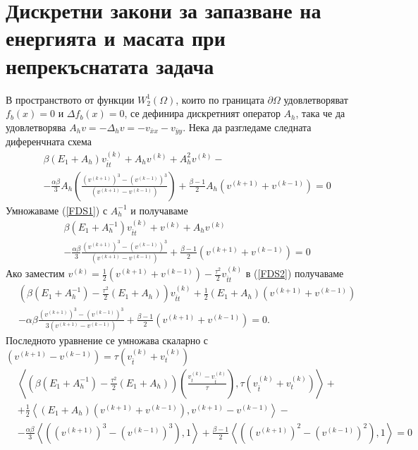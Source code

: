 \documentclass{article}
\newcommand{\rf}[1]{(\ref{#1})}
\begin{document}
\section{Дискретни закони за запазване на енергията и масата при непрекъснатата задача}
В пространството от функции $W^1_2(\Omega)$, които по границата $\partial\Omega$ удовлетворяват $f_b(x) = 0$ и $\Delta f_b(x) = 0$, се дефинира дискретният оператор $A_h$, така че да удовлетворява $A_h v=-\Delta_h v=-v_{\bar{x}x} - v_{\bar{y}y}$. Нека да разгледаме следната диференчната схема
\begin{align}\label{FDS1}
&\beta (E_1+A_h)v_{\bar{t}t}^{(k)} + A_hv^{(k)}+A_h^2 v^{(k)} -\nonumber\\
&-\frac{\alpha \beta}{3} A_h\left(\frac{(v^{(k+1)})^3-(v^{(k-1)})^3}{(v^{(k+1)}-v^{(k-1)})} \right) + \frac{\beta - 1}{2}A_h\left( v^{(k+1)}+v^{(k-1)} \right) =0
\end{align}
Умножаваме \rf{FDS1} с $A_h^{-1}$ и получаваме
\begin{align}\label{FDS2}
&\beta (E_1+A_h^{-1})v_{\bar{t}t}^{(k)} + v^{(k)}+A_h v^{(k)} \nonumber\\
&-\frac{\alpha \beta}{3} \frac{(v^{(k+1)})^3-(v^{(k-1)})^3}{(v^{(k+1)}-v^{(k-1)})} + \frac{\beta - 1}{2}\left( v^{(k+1)} + v^{(k-1)} \right)= 0
\end{align}
Ако заместим $v^{(k)}=\frac{1}{2}(v^{(k+1)}+v^{(k-1)})-\frac{\tau^2}{2}v_{\bar{t}t}^{(k)}$ в \rf{FDS2} получаваме
\begin{align*}
&\left( \beta (E_1+A_h^{-1})- \frac{\tau^2}{2}(E_1+A_h ) \right)v_{\bar{t}t}^{(k)}  + \frac{1}{2} (E_1 +A_h )(v^{(k+1)}+v^{(k-1)}) \\
&-\alpha \beta \frac{(v^{(k+1)})^3-(v^{(k-1)})^3}{3(v^{(k+1)}-v^{(k-1)})} + \frac{\beta - 1}{2}\left( v^{(k+1)}+v^{(k-1)} \right) = 0.
\end{align*}
Последното уравнение се умножава скаларно с $(v^{(k+1)}-v^{(k-1)})=\tau (v_{\bar{t}}^{(k)} + v_{t}^{(k)})$
\begin{align*}
&\left< \left( \beta (E_1+A_h^{-1})- \frac{\tau^2}{2}( E_1+A_h ) \right) \left( \frac{v_{t}^{(k)} - v_{\bar t}^{(k)}}{\tau}   \right ), \tau (v_{\bar{t}}^{(k)} + v_{t}^{(k)}) \right>  + \\
& +\frac{1}{2} \left<  (E_1 +A_h ) \left( v^{(k+1)} + v^{(k-1)} \right ) , v^{(k+1)} - v^{(k-1)} \right> - \\
&- \frac{\alpha \beta}{3} \left< \left( (v^{(k+1)})^3-(v^{(k-1)})^3 \right), 1 \right> + \frac{\beta - 1}{2} \left< \left( (v^{(k+1)})^2-(v^{(k-1)})^2 \right), 1 \right> =0
\end{align*}
\end{document}

